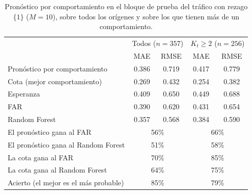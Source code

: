 \begin{table}[H]
\centering\small
\setlength{\tabcolsep}{4pt}
\caption{Pronóstico por comportamiento en el bloque de prueba del tráfico con rezago $\{1\}$ ($M = 10$), sobre todos los orígenes y sobre los que tienen más de un comportamiento.}
\label{tab:apl_pronostico_101}
\begin{tabular}{l cc cc}
\hline
& \multicolumn{2}{c}{Todos ($n = 357$)} & \multicolumn{2}{c}{$K_t \ge 2$ ($n = 256$)} \\
 & MAE & RMSE & MAE & RMSE \\
\hline
Pronóstico por comportamiento & 0.386 & 0.719 & 0.417 & 0.779 \\
Cota (mejor comportamiento) & 0.269 & 0.432 & 0.254 & 0.382 \\
Esperanza & 0.409 & 0.650 & 0.449 & 0.688 \\
FAR & 0.390 & 0.620 & 0.431 & 0.654 \\
Random Forest & 0.357 & 0.568 & 0.384 & 0.590 \\
\hline
El pronóstico gana al FAR & \multicolumn{2}{c}{56\%} & \multicolumn{2}{c}{66\%} \\
El pronóstico gana al Random Forest & \multicolumn{2}{c}{51\%} & \multicolumn{2}{c}{58\%} \\
La cota gana al FAR & \multicolumn{2}{c}{70\%} & \multicolumn{2}{c}{85\%} \\
La cota gana al Random Forest & \multicolumn{2}{c}{64\%} & \multicolumn{2}{c}{75\%} \\
Acierto (el mejor es el más probable) & \multicolumn{2}{c}{85\%} & \multicolumn{2}{c}{79\%} \\
\hline
\end{tabular}
\end{table}

